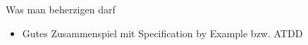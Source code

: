

\begin{frame}{Was man beherzigen darf}
\begin{itemize}
\item Gutes Zusammenspiel mit Specification by Example bzw. ATDD
\end{itemize}
\end{frame}




%


